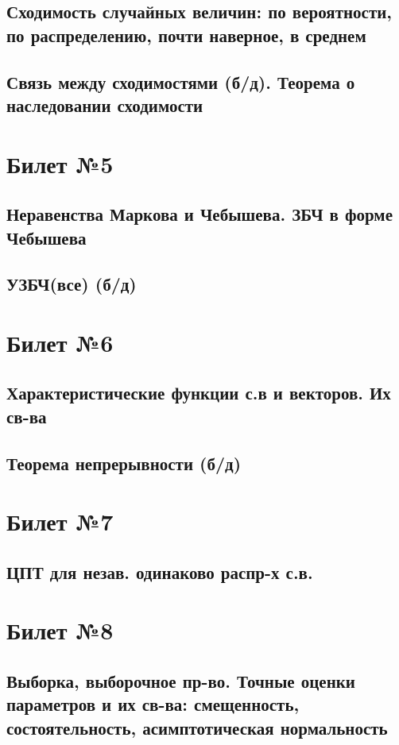 \documentclass[a4paper]{article}
\theoremstyle{plain}
\theoremstyle{remark}
\theoremstyle{definition}
\begin{document}
\subsection{Сходимость случайных величин: по вероятности, по распределению, почти наверное, в среднем}
\subsection{Связь между сходимостями (б/д). Теорема о наследовании сходимости}

\section{Билет №5}
\subsection{Неравенства Маркова и Чебышева. ЗБЧ в форме Чебышева}
\subsection{УЗБЧ(все) (б/д)}

\section{Билет №6}
\subsection{Характеристические функции с.в и векторов. Их св-ва}
\subsection{Теорема непрерывности (б/д)}

\section{Билет №7}
\subsection{ЦПТ для незав. одинаково распр-х с.в.}

\section{Билет №8}
\subsection{Выборка, выборочное пр-во. Точные оценки параметров и их св-ва: смещенность, состоятельность, асимптотическая нормальность}
\end{document}
